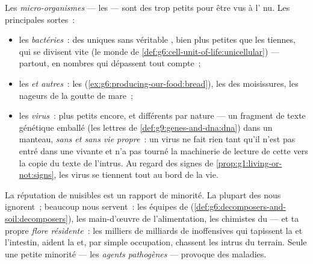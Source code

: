 \begin{definition}\label{def:g9:microbes-and-infection:sorted}
Les \emph{micro-organismes} --- les
 --- sont des  trop petits pour être
vus à l' nu. Les principales sortes~:
\begin{itemize}
  \item les \emph{bactéries}~: des 
        uniques sans véritable , bien plus petites que
        les tiennes, qui se divisent vite (le monde de
        \cref{def:g6:cell-unit-of-life:unicellular}) ---
        partout, en nombres qui dépassent tout compte~;
  \item les \emph{  et autres}~:
        les  (\cref{ex:g6:producing-our-food:bread}),
        les  des moisissures, les nageurs de la goutte
        de mare~;
  \item les \emph{virus}~: plus petits encore,
        et différents par nature --- un fragment de texte
        génétique emballé (les lettres de
        \cref{def:g9:genes-and-dna:dna}) dans un manteau,
        \emph{sans  et sans vie propre}~: un virus ne
        fait rien tant qu'il n'est pas entré dans une
         vivante et n'a pas tourné la machinerie de
        lecture de cette  vers la copie du texte de
        l'intrus. Au regard des signes de
        \cref{prop:g1:living-or-not:signs}, les virus se
        tiennent tout au bord de la vie.
\end{itemize}
\end{definition}

\begin{proposition}\label{prop:g9:microbes-and-infection:mostly}
La réputation de nuisibles est un rapport de minorité. La
plupart des  nous ignorent~; beaucoup nous
servent~: les équipes de 
(\cref{def:g6:decomposers-and-soil:decomposers}), les
main-d'œuvre de l'alimentation, les chimistes du  --- et
ta propre \emph{flore résidente}~:
les milliers de milliards de  inoffensives qui
tapissent la  et l'intestin, aident la  et,
par simple occupation, chassent les intrus du terrain.
Seule une petite minorité --- les \emph{agents
pathogènes} --- provoque des
maladies.
\end{proposition}
\admitted

